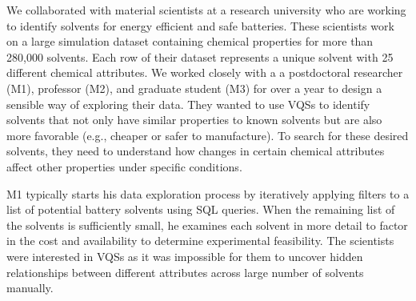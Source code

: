 \par\noindent{} We collaborated with material scientists at a research university who are working to identify solvents for energy efficient and safe batteries. These scientists work on a large simulation dataset containing chemical properties for more than 280,000 solvents. Each row of their dataset represents a unique solvent with 25 different chemical attributes. We worked closely with a a postdoctoral researcher (M1), professor (M2), and graduate student (M3) for over a year to design a sensible way of exploring their data. They wanted to use VQSs to identify solvents that not only have similar properties to known solvents but are also more favorable (e.g., cheaper or safer to manufacture). To search for these desired solvents, they need to understand how changes in certain chemical attributes affect other properties under specific conditions.
\par M1 typically starts his data exploration process by iteratively applying filters to a list of potential battery solvents using SQL queries. When the remaining list of the solvents is sufficiently small, he examines each solvent in more detail to factor in the cost and availability to determine experimental feasibility. The scientists were interested in VQSs as it was impossible for them to uncover hidden relationships between different attributes across large number of solvents manually.%